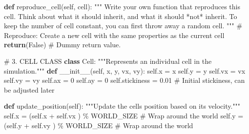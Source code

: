 \documentclass[
  letterpaper,
  DIV=11,
  numbers=noendperiod]{scrreprt}
\newenvironment{Shaded}{\begin{snugshade}}{\end{snugshade}}
\newcommand{\CommentTok}[1]{\textcolor[rgb]{0.37,0.37,0.37}{#1}}
\newcommand{\ControlFlowTok}[1]{\textcolor[rgb]{0.00,0.23,0.31}{\textbf{#1}}}
\newcommand{\DecValTok}[1]{\textcolor[rgb]{0.68,0.00,0.00}{#1}}
\newcommand{\FloatTok}[1]{\textcolor[rgb]{0.68,0.00,0.00}{#1}}
\newcommand{\FunctionTok}[1]{\textcolor[rgb]{0.28,0.35,0.67}{#1}}
\newcommand{\KeywordTok}[1]{\textcolor[rgb]{0.00,0.23,0.31}{\textbf{#1}}}
\newcommand{\NormalTok}[1]{\textcolor[rgb]{0.00,0.23,0.31}{#1}}
\newcommand{\OperatorTok}[1]{\textcolor[rgb]{0.37,0.37,0.37}{#1}}
\newcommand{\VariableTok}[1]{\textcolor[rgb]{0.07,0.07,0.07}{#1}}
\theoremstyle{definition}
\theoremstyle{remark}
\begin{document}
\begin{tcolorbox}
\begin{Shaded}
\begin{Highlighting}[]
    \KeywordTok{def}\NormalTok{ reproduce\_cell(}\VariableTok{self}\NormalTok{, cell):}
        \CommentTok{"""}
\CommentTok{        Write your own function that reproduces this cell. Think}
\CommentTok{        about what it should inherit, and what it should *not* inherit. }
\CommentTok{        }
\CommentTok{        To keep the number of cell constant, you can first throw away a random cell.}
\CommentTok{        """}
        \CommentTok{\# Reproduce: Create a new cell with the same properties as the current cell}
        \ControlFlowTok{return}\NormalTok{(}\VariableTok{False}\NormalTok{) }\CommentTok{\# Dummy \textquotesingle{}return\textquotesingle{} value.}

        
        
\CommentTok{\# 3. CELL CLASS}
\KeywordTok{class}\NormalTok{ Cell:}
    \CommentTok{"""Represents an individual cell in the simulation."""}
    \KeywordTok{def} \FunctionTok{\_\_init\_\_}\NormalTok{(}\VariableTok{self}\NormalTok{, x, y, vx, vy):}
        \VariableTok{self}\NormalTok{.x }\OperatorTok{=}\NormalTok{ x}
        \VariableTok{self}\NormalTok{.y }\OperatorTok{=}\NormalTok{ y}
        \VariableTok{self}\NormalTok{.vx }\OperatorTok{=}\NormalTok{ vx}
        \VariableTok{self}\NormalTok{.vy }\OperatorTok{=}\NormalTok{ vy}
        \VariableTok{self}\NormalTok{.ax }\OperatorTok{=} \DecValTok{0}
        \VariableTok{self}\NormalTok{.ay }\OperatorTok{=} \DecValTok{0}
        \VariableTok{self}\NormalTok{.stickiness }\OperatorTok{=} \FloatTok{0.01} \CommentTok{\# Initial stickiness, can be adjusted later}
        
    \KeywordTok{def}\NormalTok{ update\_position(}\VariableTok{self}\NormalTok{):}
        \CommentTok{"""Update the cell\textquotesingle{}s position based on its velocity."""}
        \VariableTok{self}\NormalTok{.x }\OperatorTok{=}\NormalTok{ (}\VariableTok{self}\NormalTok{.x }\OperatorTok{+} \VariableTok{self}\NormalTok{.vx ) }\OperatorTok{\%}\NormalTok{ WORLD\_SIZE  }\CommentTok{\# Wrap around the world}
        \VariableTok{self}\NormalTok{.y }\OperatorTok{=}\NormalTok{ (}\VariableTok{self}\NormalTok{.y }\OperatorTok{+} \VariableTok{self}\NormalTok{.vy ) }\OperatorTok{\%}\NormalTok{ WORLD\_SIZE  }\CommentTok{\# Wrap around the world}


\end{Highlighting}
\end{Shaded}
\end{tcolorbox}
\end{document}
